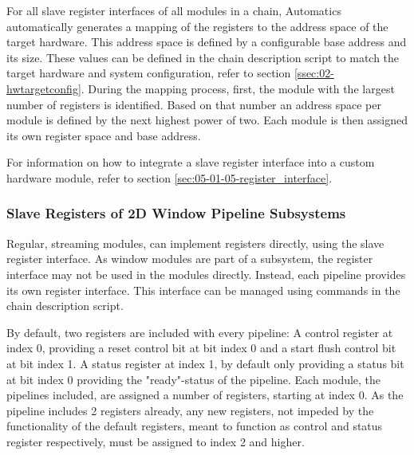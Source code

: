 For all slave register interfaces of all modules in a chain, Automatics automatically generates a mapping of the registers to the address space of the target hardware.
This address space is defined by a configurable base address and its size.
These values can be defined in the chain description script to match the target hardware and system configuration, refer to section \ref{ssec:02-hwtargetconfig}.
During the mapping process, first, the module with the largest number of registers is identified.
Based on that number an address space per module is defined by the next highest power of two.
Each module is then assigned its own register space and base address.

For information on how to integrate a slave register interface into a custom hardware module, refer to section \ref{sec:05-01-05-register_interface}.


\subsubsection{Slave Registers of 2D Window Pipeline Subsystems}

Regular, streaming \asterics modules, can implement registers directly, using the slave register interface.
As window modules are part of a subsystem, the register interface may not be used in the modules directly.
Instead, each pipeline provides its own register interface.
This interface can be managed using commands in the chain description script.


By default, two registers are included with every pipeline:
A control register at index 0, providing a reset control bit at bit index 0 and a start flush control bit at bit index 1.
A status register at index 1, by default only providing a status bit at bit index 0 providing the "ready"-status of the pipeline.
Each \asterics module, the pipelines included, are assigned a number of registers, starting at index 0.
As the pipeline includes 2 registers already, any new registers, not impeded by the functionality of the default registers, meant to function as control and status register respectively, must be assigned to index 2 and higher.

